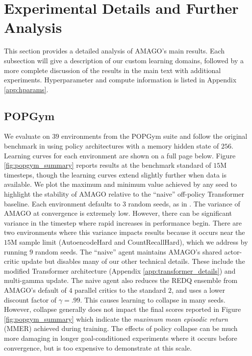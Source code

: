 \documentclass{article}
\begin{document}
\section{Experimental Details and Further Analysis}
\label{app:experiment_details}
This section provides a detailed analysis of AMAGO's main results. Each subsection will give a description of our custom learning domains, followed by a more complete discussion of the results in the main text with additional experiments. Hyperparameter and compute information is listed in Appendix \ref{app:hparams}.
\subsection{POPGym}
\label{app:experiment_details:popgym}
We evaluate on $39$ environments from the POPGym suite \cite{morad2023popgym} and follow the original benchmark in using policy architectures with a memory hidden state of $256$. Learning curves for each environment are shown on a full page below. Figure \ref{fig:popgym_summary} reports results at the benchmark standard of $15$M timesteps, though the learning curves extend slightly further when data is available. We plot the maximum and minimum value achieved by any seed to highlight the stability of AMAGO relative to the ``naive'' off-policy Transformer baseline. Each environment defaults to $3$ random seeds, as in \cite{morad2023popgym}. The variance of AMAGO at convergence is extremely low. However, there can be significant variance in the timestep where rapid increases in performance begin. There are two environments where this variance impacts results because it occurs near the $15$M sample limit (AutoencodeHard and CountRecallHard), which we address by running $9$ random seeds.
The ``naive'' agent maintains AMAGO's shared actor-critic update but disables many of our other technical details. These include the modified Transformer architecture (Appendix \ref{app:transformer_details}) and multi-gamma update. The naive agent also reduces the REDQ ensemble from AMAGO's default of $4$ parallel critics to the standard $2$, and uses a lower discount factor of $\gamma = .99$. This causes learning to collapse in many seeds. However, collapse generally does not impact the final scores reported in Figure \ref{fig:popgym_summary} which indicate the \textit{maximum mean episodic return} (MMER) achieved during training. The effects of policy collapse can be much more damaging in longer goal-conditioned experiments where it occurs before convergence, but is too expensive to demonstrate at this scale.
\end{document}
